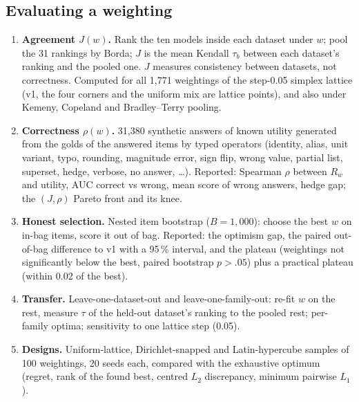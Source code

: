 \documentclass[11pt]{article}
\begin{document}
\subsection{Evaluating a weighting}
\begin{enumerate}
\item \textbf{Agreement $J(w)$.} Rank the ten models inside each dataset under $w$; pool the 31 rankings by Borda; $J$ is the mean Kendall $\tau_b$ between each dataset's ranking and the pooled one. $J$ measures consistency between datasets, not correctness. Computed for all 1,771 weightings of the step-0.05 simplex lattice (v1, the four corners and the uniform mix are lattice points), and also under Kemeny, Copeland and Bradley--Terry pooling.
\item \textbf{Correctness $\rho(w)$.} 31,380 synthetic answers of known utility generated from the golds of the answered items by typed operators (identity, alias, unit variant, typo, rounding, magnitude error, sign flip, wrong value, partial list, superset, hedge, verbose, no answer, \dots). Reported: Spearman $\rho$ between $R_w$ and utility, AUC correct vs wrong, mean score of wrong answers, hedge gap; the $(J,\rho)$ Pareto front and its knee.
\item \textbf{Honest selection.} Nested item bootstrap ($B=1{,}000$): choose the best $w$ on in-bag items, score it out of bag. Reported: the optimism gap, the paired out-of-bag difference to v1 with a 95\,\% interval, and the plateau (weightings not significantly below the best, paired bootstrap $p>.05$) plus a practical plateau (within 0.02 of the best).
\item \textbf{Transfer.} Leave-one-dataset-out and leave-one-family-out: re-fit $w$ on the rest, measure $\tau$ of the held-out dataset's ranking to the pooled rest; per-family optima; sensitivity to one lattice step (0.05).
\item \textbf{Designs.} Uniform-lattice, Dirichlet-snapped and Latin-hypercube samples of 100 weightings, 20 seeds each, compared with the exhaustive optimum (regret, rank of the found best, centred $L_2$ discrepancy, minimum pairwise $L_1$).
\end{enumerate}
\end{document}
